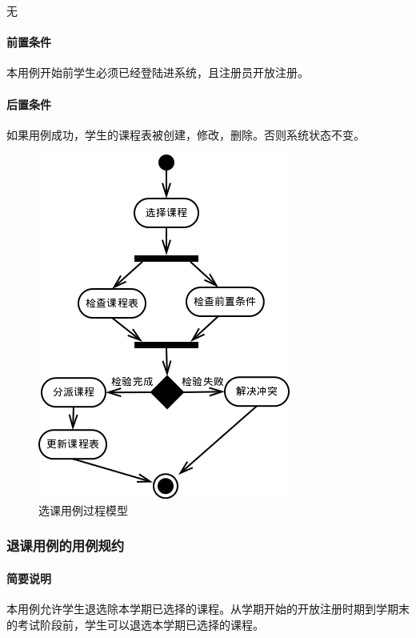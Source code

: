 无
  
\paragraph{前置条件}
  
本用例开始前学生必须已经登陆进系统，且注册员开放注册。
  
\paragraph{后置条件}
  
如果用例成功，学生的课程表被创建，修改，删除。否则系统状态不变。

\begin{figure}[H]
  \centering
  \includegraphics[scale=0.7]{img/jwxt_scourse.png}
  \caption{选课用例过程模型}
\end{figure}

\subsubsection{退课用例的用例规约}
\paragraph{简要说明}
  
本用例允许学生退选除本学期已选择的课程。从学期开始的开放注册时期到学期末的考试阶段前，学生可以退选本学期已选择的课程。
  
